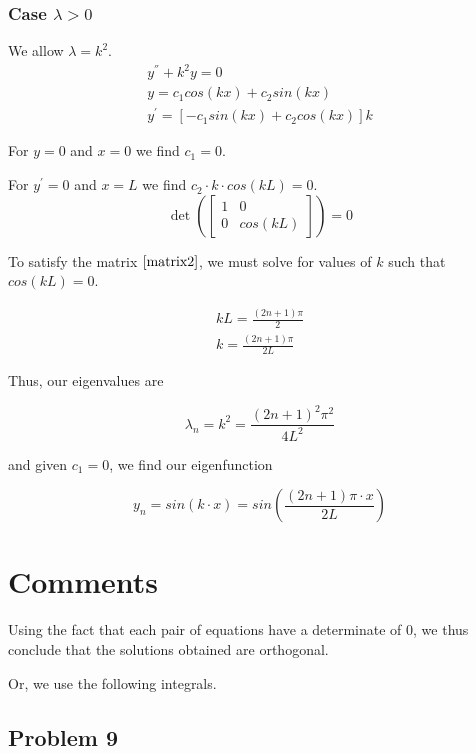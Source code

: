 \documentclass{article}
\begin{document}
\subsubsection*{Case $\lambda > 0$}

We allow $\lambda = k^2$.
\begin{align*}
y^{''}+k^{2}y=0 \\
y = c_1 cos\left(kx\right) + c_2 sin\left(kx\right) \\
y^{'} = \left[-c_1 sin\left(kx\right) + c_2 cos\left(kx\right) \right] k
\end{align*}

For $y=0$ and $x=0$ we find $c_1 = 0$.

For $y^{'}=0$ and $x=L$ we find $c_2 \cdot k \cdot cos(kL) = 0$.
\begin{equation}\label{matrix2}
\det \left( \begin{bmatrix} 1 & 0 \\ 0 & cos(kL) \end{bmatrix} \right) = 0
\end{equation}

To satisfy the matrix $\eqref{matrix2}$, we must solve for values of $k$ such that $cos\left(kL\right) = 0$.

\begin{align*}
    kL = \frac{\left(2n+1\right)\pi}{2} \\
    k = \frac{\left(2n+1\right)\pi}{2L}
\end{align*}

Thus, our eigenvalues are

$$\lambda_n = k^2 = \frac{\left(2n+1\right)^2\pi^2}{4L^2}$$

and given $c_1=0$, we find our eigenfunction

$$y_n = sin\left( k \cdot x\right) = sin \left( \frac{\left(2n+1\right)\pi \cdot x}{2L}\right)$$


\pagebreak
\section*{Comments}
Using the fact that each pair of equations have a determinate of 0, we thus conclude that the solutions obtained are orthogonal. 

Or, we use the following integrals.


\subsection*{Problem 9}
\end{document}
